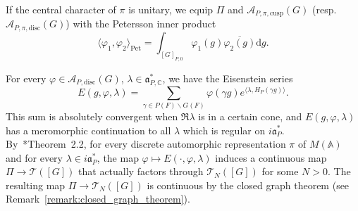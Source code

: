 \documentclass[letterpaper,11pt]{amsart}
\newcommand{\fa}{\mathfrak{a}}
\newcommand{\bA}{\mathbb{A}}
\newcommand{\C}{\mathbb{C}}
\newcommand{\cA}{\mathcal{A}}
\newcommand{\cT}{\mathcal{T}}
\newcommand{\rd}{\mathrm{d}}
\newcommand{\bs}{\backslash}
\newcommand{\<}{\negthickspace}
\theoremstyle{definition}
\theoremstyle{plain}
\theoremstyle{remark}
\numberwithin{equation}{section}
\begin{document}
If the central character of $\pi$ is unitary, we equip $\Pi$ and $\cA_{P, \pi, \mathrm{cusp}}(G)$ (resp. $\cA_{P, \pi, \mathrm{disc}}(G)$) with the Petersson inner product
\begin{equation}
\label{eq:Petersson}
     \langle \varphi_1, \varphi_2 \rangle_{\mathrm{Pet}} =
    \int_{[G]_{P,0}} \varphi_1(g) \overline{\varphi_2(g)} \rd g.
\end{equation}




For every $\varphi \in \cA_{P, \mathrm{disc}}(G)$, $\lambda \in \fa_{P,
\C}^*$, we have the Eisenstein series
    \[
    E(g, \varphi, \lambda) = \sum_{\gamma \in P(F) \bs G(F)}
    \varphi(\gamma g) e^{\langle \lambda, H_P(\gamma g) \rangle}.
    \]
This sum is absolutely convergent when $\Re \lambda$ is in a certain cone,
and $E(g, \varphi, \lambda)$ has a meromorphic continuation to all $\lambda$ which is regular on $i \fa_P^*$. By~\cite{Lap}*{Theorem~2.2}, for every discrete automorphic representation $\pi$ of $M(\bA)$ and for every $\lambda \in i
\mathfrak{a}_P^*$, the map
$\varphi \mapsto E( \cdot, \varphi, \lambda)$ induces a continuous map $\Pi \to
\mathcal{T}([G])$ that actually factors through $\cT_N([G])$ for some $N>0$. The resulting map $\Pi \to \cT_N([G])$ is continuous by the closed graph theorem (see Remark~\ref{remark:closed_graph_theorem}).
\end{document}
